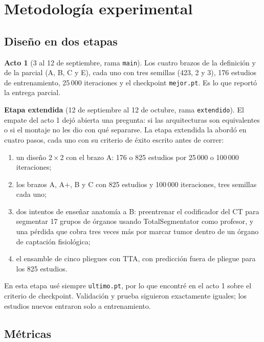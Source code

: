 \section{Metodología experimental}

\subsection{Diseño en dos etapas}

\textbf{Acto 1} (3 al 12 de septiembre, rama \texttt{main}). Los cuatro brazos de la definición y de la parcial (A, B, C y E), cada uno con tres semillas (423, 2 y 3), 176 estudios de entrenamiento, 25\,000 iteraciones y el checkpoint \texttt{mejor.pt}. Es lo que reportó la entrega parcial.

\textbf{Etapa extendida} (12 de septiembre al 12 de octubre, rama \texttt{extendido}). El empate del acto 1 dejó abierta una pregunta: si las arquitecturas son equivalentes o si el montaje no les dio con qué separarse. La etapa extendida la abordó en cuatro pasos, cada uno con su criterio de éxito escrito antes de correr:
\begin{enumerate}
\item un diseño 2\,×\,2 con el brazo A: 176 o 825 estudios por 25\,000 o 100\,000 iteraciones;
\item los brazos A, A+, B y C con 825 estudios y 100\,000 iteraciones, tres semillas cada uno;
\item dos intentos de enseñar anatomía a B: preentrenar el codificador del CT para segmentar 17 grupos de órganos usando TotalSegmentator como profesor, y una pérdida que cobra tres veces más por marcar tumor dentro de un órgano de captación fisiológica;
\item el ensamble de cinco pliegues con TTA, con predicción fuera de pliegue para los 825 estudios.
\end{enumerate}
En esta etapa usé siempre \texttt{ultimo.pt}, por lo que encontré en el acto 1 sobre el criterio de checkpoint. Validación y prueba siguieron exactamente iguales; los estudios nuevos entraron solo a entrenamiento.

\subsection{Métricas}

